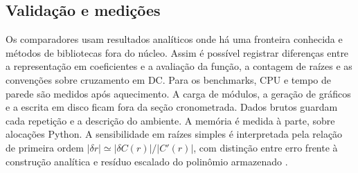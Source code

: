\subsection{Validação e medições}
Os comparadores usam resultados analíticos onde há uma fronteira
conhecida e métodos de bibliotecas fora do núcleo. Assim é possível
registrar diferenças entre a representação em coeficientes e a avaliação
da função, a contagem de raízes e as convenções sobre cruzamento em DC.
Para os benchmarks, CPU e tempo de parede são medidos após aquecimento.
A carga de módulos, a geração de gráficos e a escrita em disco ficam
fora da seção cronometrada. Dados brutos guardam cada repetição e a
descrição do ambiente. A memória é medida à parte, sobre alocações
Python. A sensibilidade em raízes simples é interpretada pela relação
de primeira ordem $|\delta r|\simeq |\delta C(r)|/|C'(r)|$,
com distinção entre erro frente à construção analítica e resíduo
escalado do polinômio armazenado \cite{wilkinson1959}.
